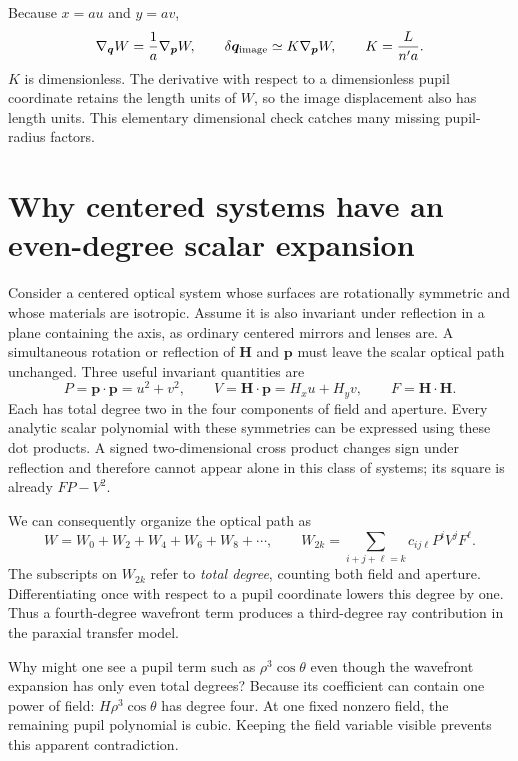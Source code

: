 Because $x=au$ and $y=av$,
\begin{equation}
 \nabla_{\bm q}W=\frac{1}{a}\nabla_{\bm p}W,
 \qquad
 \delta\bm q_{\rm image}\simeq K\nabla_{\bm p}W,
 \qquad K=\frac{L}{n'a}.
 \label{ab:K}
\end{equation}
$K$ is dimensionless. The derivative with respect to a dimensionless pupil
coordinate retains the length units of $W$, so the image displacement also
has length units. This elementary dimensional check catches many missing
pupil-radius factors.

\section{Why centered systems have an even-degree scalar expansion}
Consider a centered optical system whose surfaces are rotationally symmetric
and whose materials are isotropic. Assume it is also invariant under reflection
in a plane containing the axis, as ordinary centered mirrors and lenses are.
A simultaneous rotation or reflection of $\bm H$ and $\bm p$ must leave the
scalar optical path unchanged. Three useful invariant quantities are
\begin{equation}
 P=\bm p\cdot\bm p=u^2+v^2,\qquad
 V=\bm H\cdot\bm p=H_xu+H_yv,\qquad
 F=\bm H\cdot\bm H.
 \label{ab:invariants}
\end{equation}
Each has total degree two in the four components of field and aperture.
Every analytic scalar polynomial with these symmetries can be expressed using
these dot products. A signed two-dimensional cross product changes sign under
reflection and therefore cannot appear alone in this class of systems; its
square is already $FP-V^2$.

We can consequently organize the optical path as
\begin{equation}
 W=W_0+W_2+W_4+W_6+W_8+\cdots,
 \qquad
 W_{2k}=\sum_{i+j+\ell=k}c_{ij\ell}P^iV^jF^\ell.
 \label{ab:generalorder}
\end{equation}
The subscripts on $W_{2k}$ refer to \emph{total degree}, counting both field
and aperture. Differentiating once with respect to a pupil coordinate lowers
this degree by one. Thus a fourth-degree wavefront term produces a
third-degree ray contribution in the paraxial transfer model.

Why might one see a pupil term such as $\rho^3\cos\theta$ even though the
wavefront expansion has only even total degrees? Because its coefficient can
contain one power of field: $H\rho^3\cos\theta$ has degree four. At one fixed
nonzero field, the remaining pupil polynomial is cubic. Keeping the field
variable visible prevents this apparent contradiction.

